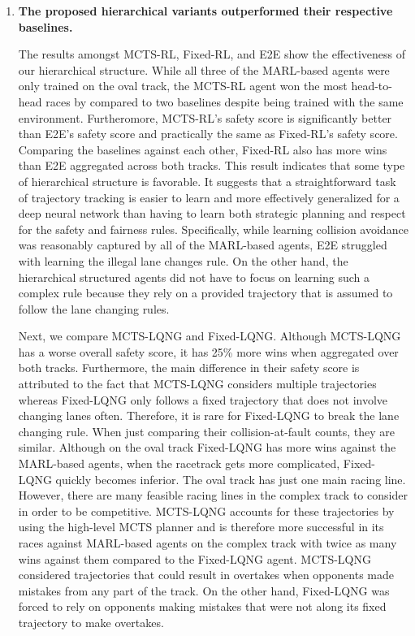 \begin{enumerate}[wide, labelindent=0pt, font=\bfseries]
\item \textbf{The proposed hierarchical variants outperformed their respective baselines.} 

The results amongst MCTS-RL, Fixed-RL, and E2E show the effectiveness of our hierarchical structure. While all three of the MARL-based agents were only trained on the oval track, the MCTS-RL agent won the most head-to-head races by compared to two baselines despite being trained with the same environment. Furtheromore, MCTS-RL's safety score is significantly better than E2E's safety score and practically the same as Fixed-RL's safety score. Comparing the baselines against each other, Fixed-RL also has more wins than E2E aggregated across both tracks. This result indicates that some type of hierarchical structure is favorable. It suggests that a straightforward task of trajectory tracking is easier to learn and more effectively generalized for a deep neural network than having to learn both strategic planning and respect for the safety and fairness rules. Specifically, while learning collision avoidance was reasonably captured by all of the MARL-based agents, E2E struggled with learning the illegal lane changes rule. On the other hand, the hierarchical structured agents did not have to focus on learning such a complex rule because they rely on a provided trajectory that is assumed to follow the lane changing rules.

Next, we compare MCTS-LQNG and Fixed-LQNG. Although MCTS-LQNG has a worse overall safety score, it has 25\% more wins when aggregated over both tracks. Furthermore, the main difference in their safety score is attributed to the fact that MCTS-LQNG considers multiple trajectories whereas Fixed-LQNG only follows a fixed trajectory that does not involve changing lanes often. Therefore, it is rare for Fixed-LQNG to break the lane changing rule. When just comparing their collision-at-fault counts, they are similar. Although on the oval track Fixed-LQNG has more wins against the MARL-based agents, when the racetrack gets more complicated, Fixed-LQNG quickly becomes inferior. The oval track has just one main racing line. However, there are many feasible racing lines in the complex track to consider in order to be competitive. MCTS-LQNG accounts for these trajectories by using the high-level MCTS planner and is therefore more successful in its races against MARL-based agents on the complex track with twice as many wins against them compared to the Fixed-LQNG agent. MCTS-LQNG considered trajectories that could result in overtakes when opponents made mistakes from any part of the track. On the other hand, Fixed-LQNG was forced to rely on opponents making mistakes that were not along its fixed trajectory to make overtakes. 


\end{enumerate}
